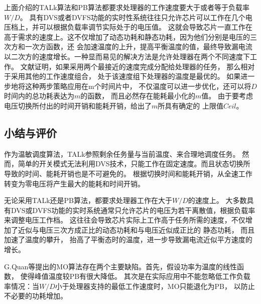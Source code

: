 上面介绍的TALk算法和PB算法都要求处理器的工作速度要大于或者等于负载率$W/D$。 具有DVS或者DVFS功能的实时性系统往往只允许芯片可以工作在几个电压档上，并可以根据负载率调节实际处于的电压值。 这就会导致芯片一直工作在高于需求的速度上。这不仅增加了动态功耗和静态功耗，因为他们分别是电压的三次方和一次方函数，还 会加速温度的上升，提高平衡温度的值，最终导致漏电流以二次方的速度增长。一种显而易见的解决方法是允许处理器在两个不同速度下工作。 文献证明，如果采用两个最接近的速度完成分配给处理器的任务， 那么相对于采用其他的工作速度组合， 处于该速度组下处理器的温度是最优的。 如果进一步地将这种两步策略应用在m个时间片中， 不仅温度可以进一步优化，还可以将$D$时间内的总功耗表达为$m$的函数， 而且必然存在能耗最小化的$m$值。 由于要考虑电压切换所付出的时间开销和能耗开销，给出了$m$所具有确定的 上限值$Ceil$。

\subsection{小结与评价}
作为温敏调度算法，TALk参照剩余任务量与当前温度、来合理地调度任务。 然而，简单的开关模式无法利用DVS技术，只能工作在固定速度。而且状态切换所导致的时间、能耗开销也是不可避免的。 根据切换时间和能耗开销，从全速工作转变为零电压将产生最大的能耗和时间开销。

无论采用TALk还是PB算法，都要求处理器工作在大于$W/D$的速度上。 大多数具有DVS或DVFS功能的实时系统通常只允许芯片的电压为若干离散值，根据负载率来调整电压工作档。 这往往会导致芯片实际上工作高于任务所需的速度，不仅增加了近似与电压三次方成正比的动态功耗和与电压近似成正比的 静态功耗， 而且加速了温度的攀升， 抬高了平衡态时的温度，进一步导致漏电流近似平方速度的增长。

G.Quan等提出的MO算法存在两个主要缺陷。首先，假设功率为温度的线性函数， 使得峰值温度较PB有很大降低。 其次是在实际应用中不能忽略低工作负载率情况：当$W/D$小于处理器支持的最低工作速度时，MO只能退化为PB， 以防止不必要的功耗增加。

